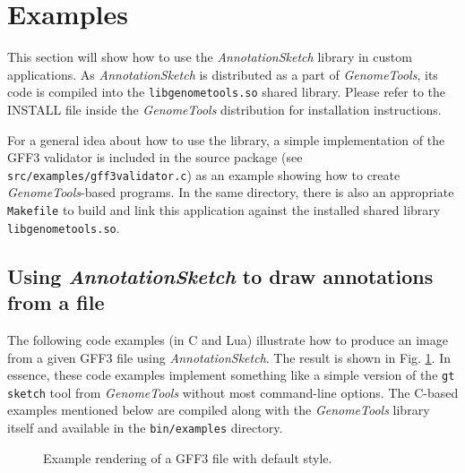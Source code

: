\documentclass[a4paper]{scrreprt}
\begin{document}
\section{Examples}

This section will show how to use the \emph{AnnotationSketch} library in custom applications. As \emph{AnnotationSketch} is distributed as a part of \emph{GenomeTools}, its code is compiled into the \texttt{libgenometools.so} shared library. Please refer to the INSTALL file inside the \emph{GenomeTools} distribution for installation instructions.

For a general idea about how to use the library, a simple implementation of the GFF3 validator is included in the source package (see \texttt{src/examples/gff3validator.c}) as an example showing how to create \emph{GenomeTools}-based programs. In the same directory, there is also an appropriate \texttt{Makefile} to build and link this application against the installed shared library \texttt{libgenometools.so}.

\subsection{Using \emph{AnnotationSketch} to draw annotations from a file}
The following code examples (in C and Lua) illustrate how to produce an image from a given GFF3 file using \emph{AnnotationSketch}. The result is shown in Fig. \ref{parsed_img}. In essence, these code examples implement something like a simple version of the \texttt{gt sketch} tool from \emph{GenomeTools} without most command-line options. The C-based examples mentioned below are compiled along with the \emph{GenomeTools} library itself and available in the \texttt{bin/examples} directory.

\begin{figure}
\caption{Example rendering of a GFF3 file with default style.}
\label{parsed_img}
\end{figure}
\end{document}
